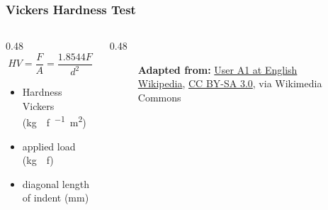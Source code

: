 \begin{frame}
	\frametitle{Vickers Hardness Test}

    \begin{columns}
        \begin{column}{0.48\linewidth}
            \[HV=\dfrac{F}{A}=\dfrac{1.8544F}{d^2}\]
            \begin{itemize}[<+- | alert@+>]
                \item[$HV$] Hardness Vickers (\unit{\kilogram{}f\per\milli\square\meter})
                \item[$F$] applied load (\unit{\kilogram{}f})
                \item[$d$] diagonal length of indent (\unit{\milli\meter})
            \end{itemize}
        \end{column}
        \begin{column}{0.48\linewidth}
            \begin{figure}
                \centering
                \resizebox{0.5\linewidth}{!}{
                    
                }

                \vspace{0.5em}
                {\tiny \textbf{Adapted from:}  \href{https://commons.wikimedia.org/wiki/File:Vickers-path.svg}{User A1 at English Wikipedia}, \href{https://creativecommons.org/licenses/by-sa/3.0}{CC BY-SA 3.0}, via Wikimedia Commons\par}
            \end{figure}
        \end{column}
    \end{columns}
\end{frame}

